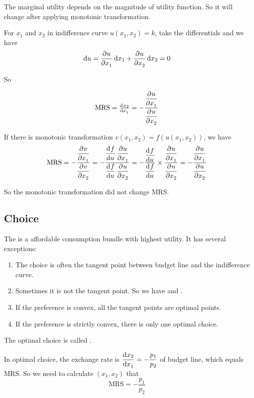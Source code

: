 The marginal utility depends on the magnitude of utility function. So it will change after applying monotonic transformation. 


For $x_1$ and $x_2$ in indifference curve $u(x_1,x_2) = k$, take the differentials and we have
\begin{equation}
    \dif{u} = \dpd{u}{x_1} \dif{x_1} + \dpd{u}{x_2} \dif{x_2} = 0
\end{equation}

So 

\begin{equation}
    \text{MRS} = \od{x_2}{x_1} = - \frac{\dpd{u}{x_1}}{\dpd{u}{x_2}}
\end{equation}


If there is monotonic transformation $v(x_1,x_2) = f(u(x_1,x_2))$, we have 
\begin{equation}
    \text{MRS} = - \frac{\dpd{v}{x_1}}{\dpd{v}{x_2}} = - \frac{\dod{f}{u} \dpd{u}{x_1}}{\dod{f}{u} \dpd{u}{x_2}} 
= - \frac{\dod{f}{u}}{\dod{f}{u}} \times \frac{\dpd{u}{x_1}}{\dpd{u}{x_2}} = - \frac{\dpd{u}{x_1}}{\dpd{u}{x_2}}    
\end{equation}

So the monotonic transformation did not change MRS. 


\subsection{Choice}

The  is a affordable consumption bundle with highest utility. It has several exceptions:
\begin{enumerate}
    \item The choice is often the tangent point between budget line and the indifference curve.
    \item Sometimes it is not the tangent point. So we have  and .
    \item If the preference is convex, all the tangent points are optimal points.
    \item If the preference is strictly convex, there is only one optimal choice.
\end{enumerate}

The optimal choice is called . 

In optimal choice, the exchange rate is $\displaystyle \dod{x_2}{x_1} = - \frac{p_1}{p_2}$ of budget line, which equals MRS. So we need to calculate $(x_1,x_2)$ that 
\begin{equation}
    \text{MRS} = - \frac{p_1}{p_2} 
\end{equation}

